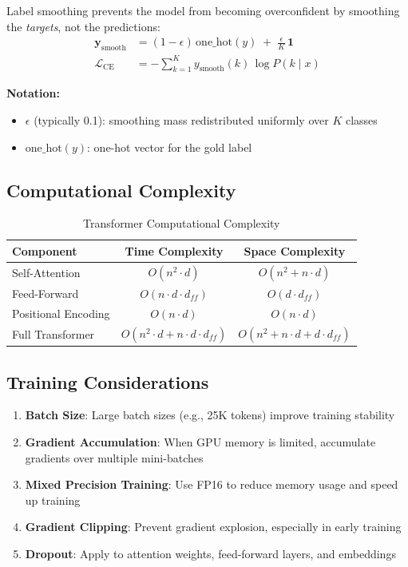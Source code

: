 \documentclass[11pt]{article}
\begin{document}
Label smoothing prevents the model from becoming overconfident by smoothing the \emph{targets}, not the predictions:
\begin{align}
\mathbf{y}_{\text{smooth}} &= (1-\epsilon)\,\text{one\_hot}(y) 
\; +\; \frac{\epsilon}{K}\,\mathbf{1} \\
\mathcal{L}_{\text{CE}} &= - \sum_{k=1}^{K} y_{\text{smooth}}(k)\, \log P(k\mid x)
\end{align}
\begin{notationbox}
\textbf{Notation:}
\begin{itemize}
    \item $\epsilon$ (typically 0.1): smoothing mass redistributed uniformly over $K$ classes
    \item $\text{one\_hot}(y)$: one-hot vector for the gold label
\end{itemize}
\end{notationbox}

\subsection{Computational Complexity}

\begin{table}[H]
\centering
\caption{Transformer Computational Complexity}
\begin{tabular}{l c c}
\toprule
\textbf{Component} & \textbf{Time Complexity} & \textbf{Space Complexity} \\
\midrule
Self-Attention & $O(n^2 \cdot d)$ & $O(n^2 + n \cdot d)$ \\
Feed-Forward & $O(n \cdot d \cdot d_{ff})$ & $O(d \cdot d_{ff})$ \\
Positional Encoding & $O(n \cdot d)$ & $O(n \cdot d)$ \\
Full Transformer & $O(n^2 \cdot d + n \cdot d \cdot d_{ff})$ & $O(n^2 + n \cdot d + d \cdot d_{ff})$ \\
\bottomrule
\end{tabular}
\end{table}

\subsection{Training Considerations}

\begin{enumerate}
    \item \textbf{Batch Size}: Large batch sizes (e.g., 25K tokens) improve training stability
    \item \textbf{Gradient Accumulation}: When GPU memory is limited, accumulate gradients over multiple mini-batches
    \item \textbf{Mixed Precision Training}: Use FP16 to reduce memory usage and speed up training
    \item \textbf{Gradient Clipping}: Prevent gradient explosion, especially in early training
    \item \textbf{Dropout}: Apply to attention weights, feed-forward layers, and embeddings
\end{enumerate}
\end{document}

